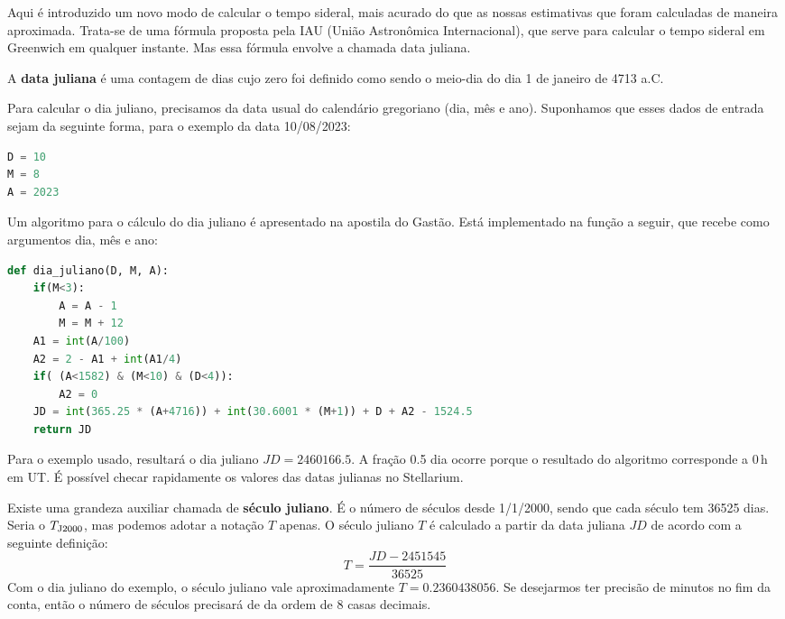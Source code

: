 Aqui é introduzido um novo modo de calcular o tempo sideral, mais acurado do que as nossas estimativas que foram calculadas de maneira aproximada. Trata-se de uma fórmula proposta pela IAU (União Astronômica Internacional), que serve para calcular o tempo sideral em Greenwich em qualquer instante. Mas essa fórmula envolve a chamada data juliana. 

A \textbf{data juliana} é uma contagem de dias cujo zero foi definido como sendo o meio-dia do dia 1 de janeiro de 4713 a.C. 

Para calcular o dia juliano, precisamos da data usual do calendário gregoriano (dia, mês e ano). Suponhamos que esses dados de entrada sejam da seguinte forma, para o exemplo da data 10/08/2023:

\begin{lstlisting}[language=Python]
D = 10
M = 8
A = 2023
\end{lstlisting}

\noindent Um algoritmo para o cálculo do dia juliano é apresentado na apostila do Gastão. Está implementado na função a seguir, que recebe como argumentos dia, mês e ano:

\begin{lstlisting}[language=Python]
def dia_juliano(D, M, A):
    if(M<3):
        A = A - 1
        M = M + 12
    A1 = int(A/100)
    A2 = 2 - A1 + int(A1/4)        
    if( (A<1582) & (M<10) & (D<4)):
        A2 = 0
    JD = int(365.25 * (A+4716)) + int(30.6001 * (M+1)) + D + A2 - 1524.5
    return JD
\end{lstlisting}

\noindent Para o exemplo usado, resultará o dia juliano $JD = 2460166.5$. A fração 0.5 dia ocorre porque o resultado do algoritmo corresponde a 0\,h em UT. É possível checar rapidamente os valores das datas julianas no Stellarium.

Existe uma grandeza auxiliar chamada de \textbf{século juliano}. É o número de séculos desde 1/1/2000, sendo que cada século tem 36525 dias. Seria o $T_{\rm J2000}$, mas podemos adotar a notação $T$ apenas. O século juliano $T$ é calculado a partir da data juliana $JD$ de acordo com a seguinte definição:
%
\begin{equation}
T = \frac{JD - 2451545}{36525}
\end{equation}
%
Com o dia juliano do exemplo, o século juliano vale aproximadamente $T = 0.2360438056$. Se desejarmos ter precisão de minutos no fim da conta, então o número de séculos precisará de da ordem de 8 casas decimais.

